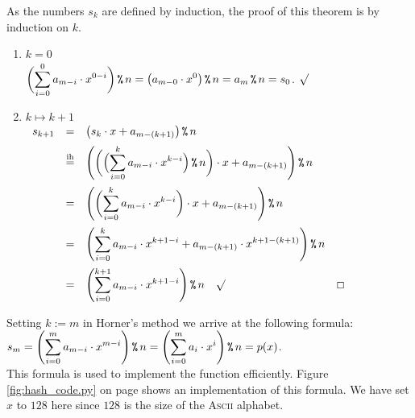 \proof
As the numbers $s_k$ are defined by induction, the proof of this theorem is by
induction on $k$.
\begin{enumerate}
\item[B.C.:] $k = 0$
             \\[0.2cm]
             \hspace*{1.3cm}
           $\displaystyle\biggl(\sum\limits_{i=0}^0 a_{m-i} \cdot x^{0-i}\biggr) \,\texttt{\%}\, n = \bigl(a_{m-0} \cdot x^0
          \bigr)\,\texttt{\%}\, n = a_m \,\texttt{\%}\, n = s_0$. $\surd$
\item[I.S.:] $k \mapsto k + 1$
             \\[0.2cm]
             \hspace*{1.3cm}
             $
             \begin{array}{lcll}
               s_{k+1} & = & \bigl(s_k \cdot x + a_{m - (k+1)} \bigr) \,\texttt{\%}\, n \\[0.2cm]
                      & \stackrel{\mathrm{ih}}{=} & \displaystyle\Biggl(\biggl(\Bigl(\sum\limits_{i=0}^k a_{m-i} \cdot x^{k-i} \Bigr) \,\texttt{\%}\, n\biggr) \cdot x + a_{m - (k+1)}\Biggr) \,\texttt{\%}\, n
                                         \\[0.5cm]
                      & = & \displaystyle\Biggl(\biggl(\sum\limits_{i=0}^k a_{m-i} \cdot x^{k-i} \biggr) \cdot x + a_{m - (k+1)}\Biggr) \,\texttt{\%}\, n
                            \\[0.5cm]
                      & = & \displaystyle\Biggl(\sum\limits_{i=0}^k a_{m-i} \cdot x^{k+1-i}  + a_{m - (k+1)} \cdot x^{k+1-(k+1)}\Biggr) \,\texttt{\%}\, n
                            \\[0.5cm]
                      & = & \displaystyle\Biggl(\sum\limits_{i=0}^{k+1} a_{m-i} \cdot x^{k+1-i}  \Biggr) \,\texttt{\%}\, n \quad \surd & \Box
             \end{array}
             $
\end{enumerate}
Setting $k := m$ in Horner's method we arrive at the following formula:
\\[0.2cm]
\hspace*{1.3cm}
$\displaystyle s_m = \Biggl(\sum\limits_{i=0}^m a_{m - i} \cdot x^{m - i}\Biggr) \,\texttt{\%}\, n = \Biggl(\sum\limits_{i=0}^m a_{i} \cdot x^{i}\Biggr) \,\texttt{\%}\, n = p(x)$.
\\[0.2cm]
This formula is used to implement the function  efficiently.
Figure \ref{fig:hash_code.py} on page \pageref{fig:hash_code.py} shows an implementation of this formula.  We
have set $x$ to $128$ here since $128$ is the size of the \textsc{Ascii} alphabet.

